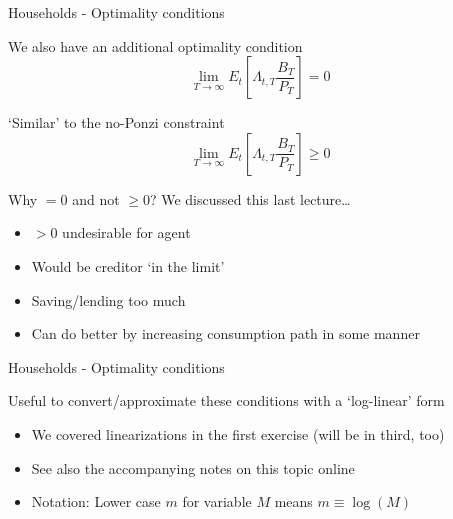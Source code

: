 

\begin{frame}{Households - Optimality conditions}

We also have an additional optimality condition
\[
\lim_{T \to \infty} E_{t} \left[ \Lambda_{t,T} \frac{B_{T}}{P_{T}} \right] = 0
\]

`Similar' to the no-Ponzi constraint
\[
\lim_{T \to \infty} E_{t} \left[ \Lambda_{t,T} \frac{B_{T}}{P_{T}} \right] \geq 0
\]

Why $=0$ and not $\geq 0$? We discussed this last lecture\ldots
\begin{itemize}
\item	$> 0$ undesirable for agent
\item	Would be creditor `in the limit'
\item	Saving/lending too much
\item	Can do better by increasing consumption path in some manner
\end{itemize}

\end{frame}



\begin{frame}{Households - Optimality conditions}

Useful to convert/approximate these conditions with a `log-linear' form
\begin{itemize}
\item	We covered linearizations in the first exercise (will be in third, too)
\item	See also the accompanying notes on this topic online
\item	Notation: Lower case $m$ for variable $M$ means $m \equiv \log{(M)}$
\end{itemize}

\end{frame}



